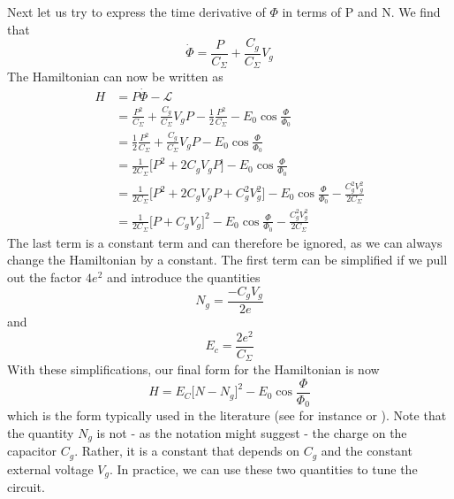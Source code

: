 \documentclass[a4paper, draft]{article}
\theoremstyle{own}
\theoremstyle{remark}
\begin{document}
Next let us try to express the time derivative of $\Phi$ in terms of P and N. We find that
$$
\dot{\Phi} = \frac{P}{C_\Sigma} + \frac{C_g}{C_\Sigma} V_g
$$
The Hamiltonian can now be written as
\begin{align*}
H &= P\dot{\Phi} - {\mathcal L} \\
&= \frac{P^2}{C_\Sigma} + \frac{C_g}{C_\Sigma} V_g P
-
\frac{1}{2}  \frac{P^2}{C_\Sigma}  - E_0 \cos \frac{\Phi}{\Phi_0} \\
&= 
\frac{1}{2}  \frac{P^2}{C_\Sigma} + \frac{C_g}{C_\Sigma} V_gP - E_0 \cos \frac{\Phi}{\Phi_0} \\
&= \frac{1}{2 C_\Sigma} \big[ P^2 + 2 C_g V_g P \big] - E_0 \cos \frac{\Phi}{\Phi_0} \\
&= \frac{1}{2 C_\Sigma} \big[ P^2 + 2 C_g V_g P + C_g^2 V_g^2 \big] 
- E_0 \cos \frac{\Phi}{\Phi_0} - \frac{C_g^2 V_g^2}{2 C_\Sigma} \\
&= \frac{1}{2 C_\Sigma} \big[ P + C_g V_g \big]^2 - E_0 \cos \frac{\Phi}{\Phi_0} - \frac{C_g^2 V_g^2}{2 C_\Sigma}
\end{align*}
The last term is a constant term and can therefore be ignored, as we can always change the Hamiltonian by a constant. The first term can be simplified if we pull out the factor $4e^2$ and introduce the quantities
$$
N_g = \frac{-C_g V_g}{2e}
$$
and
$$
E_c = \frac{2e^2}{C_\Sigma} 
$$
With these simplifications, our final form for the Hamiltonian is now
$$
H = E_C \big[ N - N_g \big]^2 -  E_0 \cos \frac{\Phi}{\Phi_0}
$$
which is the form typically used in the literature (see for instance \cite{DevoretWallraffMartinis} or \cite{WendinShumeiko}). Note that the quantity $N_g$ is not - as the notation might suggest - the charge on the capacitor $C_g$. Rather, it is a constant that depends on $C_g$ and the constant external voltage $V_g$. In practice, we can use these two quantities to tune the circuit.
\end{document}
